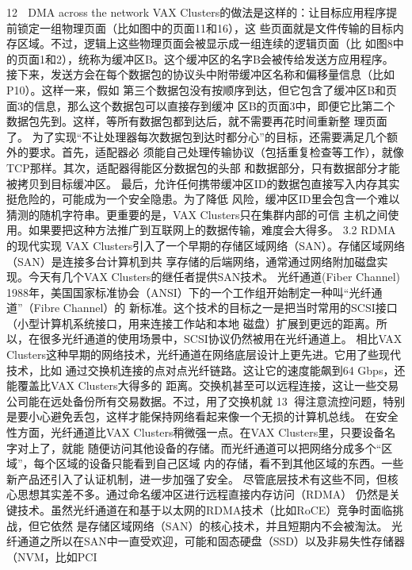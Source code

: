                                                      12
                       DMA across the network
VAX Clusters的做法是这样的：让目标应用程序提前锁定一组物理页面（比如图中的页面11和16），这
些页面就是文件传输的目标内存区域。不过，逻辑上这些物理页面会被显示成一组连续的逻辑页面（比
如图8中的页面1和2），统称为缓冲区B。这个缓冲区的名字B会被传给发送方应用程序。
接下来，发送方会在每个数据包的协议头中附带缓冲区名称和偏移量信息（比如P10）。这样一来，假如
第三个数据包没有按顺序到达，但它包含了缓冲区B和页面3的信息，那么这个数据包可以直接存到缓冲
区B的页面3中，即便它比第二个数据包先到。这样，等所有数据包都到达后，就不需要再花时间重新整
理页面了。
为了实现“不让处理器每次数据包到达时都分心”的目标，还需要满足几个额外的要求。首先，适配器必
须能自己处理传输协议（包括重复检查等工作），就像TCP那样。其次，适配器得能区分数据包的头部
和数据部分，只有数据部分才能被拷贝到目标缓冲区。
最后，允许任何携带缓冲区ID的数据包直接写入内存其实挺危险的，可能成为一个安全隐患。为了降低
风险，缓冲区ID里会包含一个难以猜测的随机字符串。更重要的是，VAX Clusters只在集群内部的可信
主机之间使用。如果要把这种方法推广到互联网上的数据传输，难度会大得多。
3.2 RDMA的现代实现
VAX Clusters引入了一个早期的存储区域网络（SAN）。存储区域网络（SAN）是连接多台计算机到共
享存储的后端网络，通常通过网络附加磁盘实现。今天有几个VAX Clusters的继任者提供SAN技术。
光纤通道(Fiber Channel)
1988年，美国国家标准协会（ANSI）下的一个工作组开始制定一种叫“光纤通道”（Fibre Channel）的
新标准。这个技术的目标之一是把当时常用的SCSI接口（小型计算机系统接口，用来连接工作站和本地
磁盘）扩展到更远的距离。所以，在很多光纤通道的使用场景中，SCSI协议仍然被用在光纤通道上。
相比VAX Clusters这种早期的网络技术，光纤通道在网络底层设计上更先进。它用了些现代技术，比如
通过交换机连接的点对点光纤链路。这让它的速度能飙到64 Gbps，还能覆盖比VAX Clusters大得多的
距离。交换机甚至可以远程连接，这让一些交易公司能在远处备份所有交易数据。不过，用了交换机就
                                                       13
得注意流控问题，特别是要小心避免丢包，这样才能保持网络看起来像一个无损的计算机总线。
在安全性方面，光纤通道比VAX Clusters稍微强一点。在VAX Clusters里，只要设备名字对上了，就能
随便访问其他设备的存储。而光纤通道可以把网络分成多个“区域”，每个区域的设备只能看到自己区域
内的存储，看不到其他区域的东西。一些新产品还引入了认证机制，进一步加强了安全。
尽管底层技术有这些不同，但核心思想其实差不多。通过命名缓冲区进行远程直接内存访问（RDMA）
仍然是关键技术。虽然光纤通道在和基于以太网的RDMA技术（比如RoCE）竞争时面临挑战，但它依然
是存储区域网络（SAN）的核心技术，并且短期内不会被淘汰。
光纤通道之所以在SAN中一直受欢迎，可能和固态硬盘（SSD）以及非易失性存储器（NVM，比如PCI
